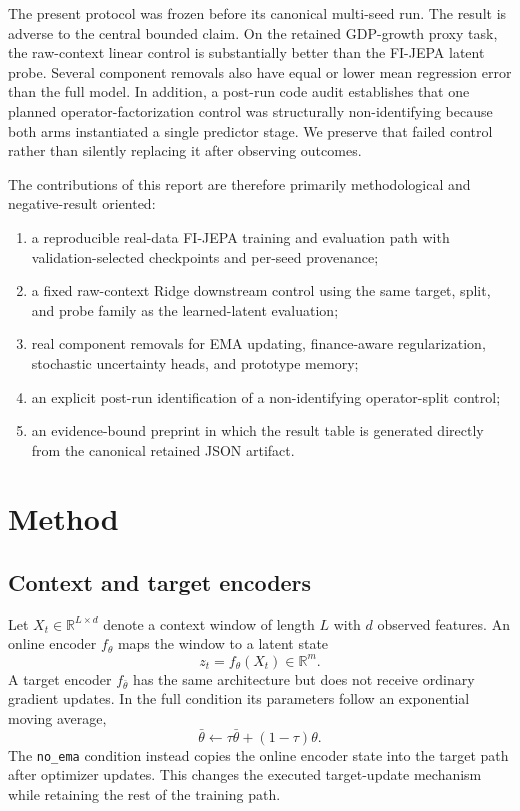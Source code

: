 \documentclass[11pt]{article}
\begin{document}
The present protocol was frozen before its canonical multi-seed run. The result is adverse to the central bounded claim. On the retained GDP-growth proxy task, the raw-context linear control is substantially better than the FI-JEPA latent probe. Several component removals also have equal or lower mean regression error than the full model. In addition, a post-run code audit establishes that one planned operator-factorization control was structurally non-identifying because both arms instantiated a single predictor stage. We preserve that failed control rather than silently replacing it after observing outcomes.

The contributions of this report are therefore primarily methodological and negative-result oriented:
\begin{enumerate}[leftmargin=1.5em]
    \item a reproducible real-data FI-JEPA training and evaluation path with validation-selected checkpoints and per-seed provenance;
    \item a fixed raw-context Ridge downstream control using the same target, split, and probe family as the learned-latent evaluation;
    \item real component removals for EMA updating, finance-aware regularization, stochastic uncertainty heads, and prototype memory;
    \item an explicit post-run identification of a non-identifying operator-split control;
    \item an evidence-bound preprint in which the result table is generated directly from the canonical retained JSON artifact.
\end{enumerate}

\section{Method}
\subsection{Context and target encoders}
Let $X_t \in \mathbb{R}^{L\times d}$ denote a context window of length $L$ with $d$ observed features. An online encoder $f_\theta$ maps the window to a latent state
\begin{equation}
    z_t = f_\theta(X_t) \in \mathbb{R}^{m}.
\end{equation}
A target encoder $f_{\bar\theta}$ has the same architecture but does not receive ordinary gradient updates. In the full condition its parameters follow an exponential moving average,
\begin{equation}
    \bar\theta \leftarrow \tau \bar\theta + (1-\tau)\theta.
\end{equation}
The \texttt{no\_ema} condition instead copies the online encoder state into the target path after optimizer updates. This changes the executed target-update mechanism while retaining the rest of the training path.
\end{document}
